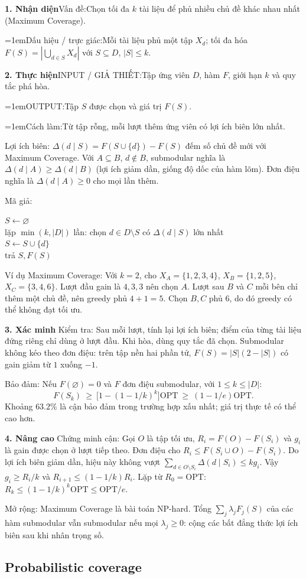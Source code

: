 \documentclass[10pt,a4paper,twocolumn]{article}
\makeatletter
\newif\ifexamheadingprinted
\newcommand{\topic}[2]{%
  \global\examheadingprintedfalse\par\subsection{#2}\label{topic:#1}}
\newcommand{\key}[1]{#1:\enspace}
\newcommand{\algfield}[2]{\par\noindent\hangindent=1em\relax#1:\enspace#2}
\newcommand{\unitheading}[2]{%
  \par\addvspace{1pt}\noindent\textbf{#1. #2}\enspace}
\newcommand{\unitverification}{\unitheading{3}{Xác minh}}
\newcommand{\unitadvanced}{\unitheading{4}{Nâng cao}}
\newcommand{\unitfield}[4]{%
  \par\noindent\textbf{#1. #2}\enspace #3:\enspace #4}
\newcommand{\algsummary}[6]{%
  \begingroup\setlength{\parskip}{1pt}%
  \unitfield{1}{Nhận diện}{Vấn đề}{#1}%
  \algfield{Dấu hiệu / trực giác}{#2}%
  \if\relax\detokenize{#3}\relax\else\par\noindent#3\par\fi%
  \unitfield{2}{Thực hiện}{INPUT / GIẢ THIẾT}{#4}%
  \algfield{OUTPUT}{#5}%
  \algfield{Cách làm}{#6}\par\endgroup}
\newenvironment{algpseudo}{%
  \par\addvspace{2pt}\noindent
  \setlength{\parskip}{0pt}%
  Mã giả:\par\nobreak
  \begin{list}{}{\setlength{\leftmargin}{1em}\setlength{\topsep}{0pt}%
    \setlength{\partopsep}{0pt}\setlength{\parsep}{0pt}%
    \@beginparpenalty=10000\relax}%
  \item\relax
}{\end{list}\par\addvspace{3pt}}
\makeatother
\begin{document}
\algsummary{Chọn tối đa $k$ tài liệu để phủ nhiều chủ đề khác nhau nhất (Maximum Coverage).}{Mỗi tài liệu phủ một tập $X_d$; tối đa hóa $F(S)=|\bigcup_{d\in S}X_d|$ với $S\subseteq D$, $|S|\le k$.}{}{Tập ứng viên $D$, hàm $F$, giới hạn $k$ và quy tắc phá hòa.}{Tập $S$ được chọn và giá trị $F(S)$.}{Từ tập rỗng, mỗi lượt thêm ứng viên có lợi ích biên lớn nhất.}

\key{Lợi ích biên} $\Delta(d\mid S)=F(S\cup\{d\})-F(S)$ đếm số chủ đề mới với Maximum Coverage. Với $A\subseteq B$, $d\notin B$, submodular nghĩa là $\Delta(d\mid A)\ge\Delta(d\mid B)$ (lợi ích giảm dần, giống độ dốc của hàm lõm). Đơn điệu nghĩa là $\Delta(d\mid A)\ge0$ cho mọi lần thêm.

\begin{algpseudo}
$S\gets\varnothing$\\
lặp $\min(k,|D|)$ lần: chọn $d\in D\setminus S$ có $\Delta(d\mid S)$ lớn nhất\\
\quad $S\gets S\cup\{d\}$\\
trả $S,F(S)$
\end{algpseudo}

\key{Ví dụ Maximum Coverage} Với $k=2$, cho $X_A=\{1,2,3,4\}$, $X_B=\{1,2,5\}$, $X_C=\{3,4,6\}$. Lượt đầu gain là $4,3,3$ nên chọn $A$. Lượt sau $B$ và $C$ mỗi bên chỉ thêm một chủ đề, nên greedy phủ $4+1=5$. Chọn $B,C$ phủ 6, do đó greedy có thể không đạt tối ưu.

\unitverification
\key{Kiểm tra} Sau mỗi lượt, tính lại lợi ích biên; điểm của từng tài liệu đứng riêng chỉ dùng ở lượt đầu. Khi hòa, dùng quy tắc đã chọn. Submodular không kéo theo đơn điệu: trên tập nền hai phần tử, $F(S)=|S|(2-|S|)$ có gain giảm từ $1$ xuống $-1$.

\key{Bảo đảm} Nếu $F(\varnothing)=0$ và $F$ đơn điệu submodular, với $1\le k\le |D|$:
\[
F(S_k)\ \ge\ \big[1-(1-1/k)^k\big]\mathrm{OPT}
\ \ge\ (1-1/e)\mathrm{OPT}.
\]
Khoảng $63.2\%$ là cận bảo đảm trong trường hợp xấu nhất; giá trị thực tế có thể cao hơn.

\unitadvanced
\key{Chứng minh cận} Gọi $O$ là tập tối ưu, $R_i=F(O)-F(S_i)$ và $g_i$ là gain được chọn ở lượt tiếp theo. Đơn điệu cho $R_i\le F(S_i\cup O)-F(S_i)$. Do lợi ích biên giảm dần, hiệu này không vượt $\sum_{d\in O\setminus S_i}\Delta(d\mid S_i)\le k g_i$. Vậy $g_i\ge R_i/k$ và $R_{i+1}\le(1-1/k)R_i$. Lặp từ $R_0=\mathrm{OPT}$: $R_k\le(1-1/k)^k\mathrm{OPT}\le\mathrm{OPT}/e$.

\key{Mở rộng} Maximum Coverage là bài toán NP-hard. Tổng $\sum_j\lambda_jF_j(S)$ của các hàm submodular vẫn submodular nếu mọi $\lambda_j\ge0$: cộng các bất đẳng thức lợi ích biên sau khi nhân trọng số.
\topic{coverage}{Probabilistic coverage}
\end{document}

